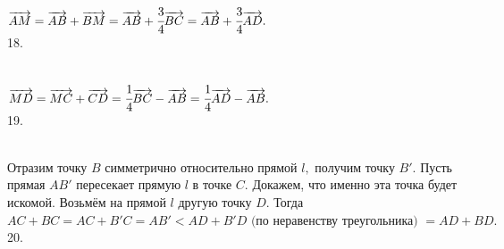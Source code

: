 \documentclass[12pt]{article}
\begin{document}
$\overrightarrow{AM}=\overrightarrow{AB}+\overrightarrow{BM}=\overrightarrow{AB}+\cfrac{3}{4}\overrightarrow{BC}=
\overrightarrow{AB}+\cfrac{3}{4}\overrightarrow{AD}.$\\
18. \begin{figure}[ht!]
\end{figure}\\
$\overrightarrow{MD}=\overrightarrow{MC}+\overrightarrow{CD}=\cfrac{1}{4}\overrightarrow{BC}-\overrightarrow{AB}=
\cfrac{1}{4}\overrightarrow{AD}-\overrightarrow{AB}.$\\
19. \begin{figure}[ht!]
\end{figure}\\
Отразим точку $B$ симметрично относительно прямой $l,$ получим точку $B'.$ Пусть прямая $AB'$ пересекает прямую $l$ в точке $C.$ Докажем, что именно эта точка будет искомой. Возьмём на прямой $l$ другую точку $D.$ Тогда $AC+BC=AC+B'C=AB'<AD+B'D\text{ (по неравенству треугольника) }=AD+BD.$\\
20. \begin{figure}[ht!]
\end{figure}\\
\end{document}
